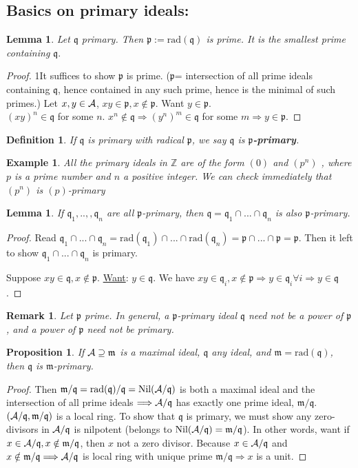 \documentclass[11pt]{article}
\newtheorem{prop}[thm]{Proposition}
\newtheorem{lemma}[thm]{Lemma}
\newtheorem{dfn}[thm]{Definition}
\newtheorem{rmk}[thm]{Remark}
\newtheorem{ex}[thm]{Example}
\newcommand{\intg}{\mathbb Z}
\newcommand{\scm}{{\mathfrak m}}
\newcommand{\scp}{{\mathfrak p}}
\newcommand{\scq}{\mathfrak q}
\newcommand{\cala}{{\cal A}}
\newcommand{\Lrta}{\Longrightarrow}
\begin{document}
\subsection*{Basics on primary ideals:}
\begin{lemma}
Let $\scq$ primary. Then $\scp:=\text{rad}(\scq)$ is prime. It is the smallest prime containing $\scq.$
\end{lemma}
\begin{proof}
1It suffices to show $\scp$ is prime. ($\scp$= intersection of all prime ideals containing $\scq$, hence contained in any such prime, hence is the minimal of such primes.) Let $x,y\in\cala$, $xy\in\scp,x\notin \scp$. Want $y\in\scp$.\\
 $(xy)^n\in\scq$ for some $n$. $x^n\notin\scq\Lrta (y^n)^m\in\scq $ for some $m$$\Lrta  y\in\scp$.
\end{proof}
\begin{dfn}
If $\scq$ is primary with radical $\scp$, we say $\scq$ is  \textbf{$\scp$-primary}.
\end{dfn}
\begin{ex}
All the primary ideals in $\intg$ are of the form $(0)$ and $(p^n)$ , where $p$ is a prime number and $n$ a positive integer. We can check immediately that $(p^n)$ is $(p)$-primary
\end{ex}
\begin{lemma}
If $\scq_1,..,,\scq_n$ are all $\scp$-primary, then $\scq=\scq_1\cap...\cap \scq_n$ is also $\scp$-primary.
\end{lemma}
\begin{proof}
Read $\scq_1\cap...\cap\scq_n=\text{rad}(\scq_1)\cap...\cap \text{rad}(\scq_n)=\scp\cap...\cap \scp=\scp$. Then it left to show $\scq_1\cap...\cap\scq_n$ is primary. 

Suppose $xy\in\scq, x\notin \scp$. \underline{Want}: $y\in \scq$. We have $xy\in \scq_i,x\notin\scp\Lrta y\in \scq_i\forall i\Lrta y\in\scq$.
\end{proof}
\begin{rmk}
Let $\scp$ prime. In general, a $\scp$-primary ideal $\scq$ need not be a power of $\scp$, and a power of $\scp$ need not be primary.
\end{rmk}
\begin{prop}
If $\cala\supseteq\scm$ is a  maximal ideal, $\scq$ any ideal, and $\scm=\text{rad}(\scq)$, then $\scq$ is $\scm$-primary.
\end{prop}
\begin{proof}
Then $\scm/\scq=\text{rad}(\scq)/\scq=\text{Nil}(  \cala/\scq)$ is both a maximal ideal and the intersection of all prime ideals $\Lrta\cala/\scq$ has exactly one prime ideal, $\scm/\scq$. $(\cala/\scq,\scm/\scq)$ is a local ring. To show that $\scq$ is primary, we must show any zero-divisors  in $\cala/\scq$ is nilpotent (belongs to $\text{Nil}(  \cala/\scq)=\scm/\scq$). In other words, want if $x\in\cala/\scq,x\notin\scm/\scq$, then $x$ not a zero divisor. Because $x\in\cala/\scq $ and $ x\notin \scm/\scq\Lrta \cala/\scq $ is local ring with unique prime $\scm/\scq\Lrta x$ is a unit.
\end{proof}
\end{document}

